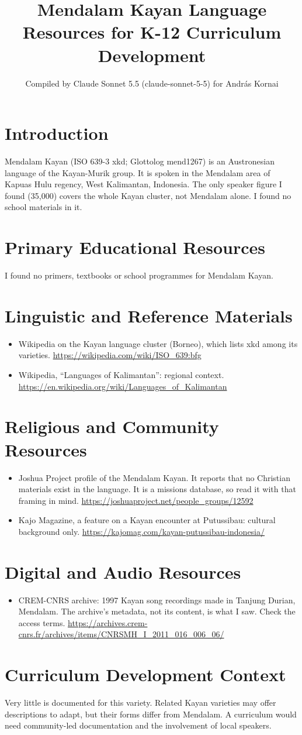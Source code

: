 \documentclass[12pt]{article}
\title{Mendalam Kayan Language Resources for K-12 Curriculum Development}
\author{Compiled by Claude Sonnet 5.5 (claude-sonnet-5-5) for Andr\'as Kornai}
\date{}
\begin{document}
\maketitle

\section{Introduction}
Mendalam Kayan (ISO 639-3 xkd; Glottolog mend1267) is an Austronesian language of the Kayan-Murik group. It is spoken in the Mendalam area of Kapuas Hulu regency, West Kalimantan, Indonesia. The only speaker figure I found (35,000) covers the whole Kayan cluster, not Mendalam alone. I found no school materials in it.

\section{Primary Educational Resources}
I found no primers, textbooks or school programmes for Mendalam Kayan.

\section{Linguistic and Reference Materials}
\begin{itemize}
\item Wikipedia on the Kayan language cluster (Borneo), which lists xkd among its varieties. \url{https://wikipedia.com/wiki/ISO_639:bfg}
\item Wikipedia, ``Languages of Kalimantan'': regional context. \url{https://en.wikipedia.org/wiki/Languages_of_Kalimantan}
\end{itemize}

\section{Religious and Community Resources}
\begin{itemize}
\item Joshua Project profile of the Mendalam Kayan. It reports that no Christian materials exist in the language. It is a missions database, so read it with that framing in mind. \url{https://joshuaproject.net/people_groups/12592}
\item Kajo Magazine, a feature on a Kayan encounter at Putussibau: cultural background only. \url{https://kajomag.com/kayan-putussibau-indonesia/}
\end{itemize}

\section{Digital and Audio Resources}
\begin{itemize}
\item CREM-CNRS archive: 1997 Kayan song recordings made in Tanjung Durian, Mendalam. The archive's metadata, not its content, is what I saw. Check the access terms. \url{https://archives.crem-cnrs.fr/archives/items/CNRSMH_I_2011_016_006_06/}
\end{itemize}

\section{Curriculum Development Context}
Very little is documented for this variety. Related Kayan varieties may offer descriptions to adapt, but their forms differ from Mendalam. A curriculum would need community-led documentation and the involvement of local speakers.
\end{document}
